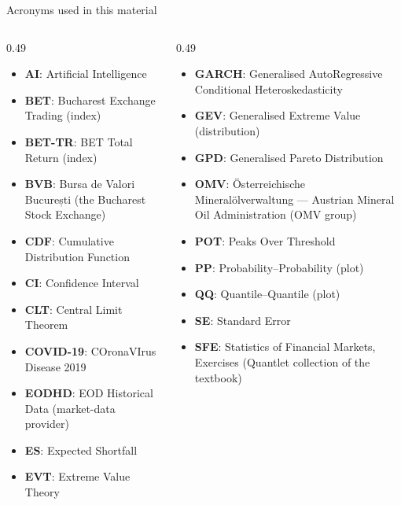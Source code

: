 {
\begin{frame}[noframenumbering]
    \titlepage
\end{frame}
}
\begin{frame}{Acronyms used in this material}
\begin{columns}[T]
\begin{column}{0.49\textwidth}
\begin{itemize}\setlength{\itemsep}{0pt}
    \item \textbf{AI}: Artificial Intelligence
    \item \textbf{BET}: Bucharest Exchange Trading (index)
    \item \textbf{BET-TR}: BET Total Return (index)
    \item \textbf{BVB}: Bursa de Valori București (the Bucharest Stock Exchange)
    \item \textbf{CDF}: Cumulative Distribution Function
    \item \textbf{CI}: Confidence Interval
    \item \textbf{CLT}: Central Limit Theorem
    \item \textbf{COVID-19}: COronaVIrus Disease 2019
    \item \textbf{EODHD}: EOD Historical Data (market-data provider)
    \item \textbf{ES}: Expected Shortfall
    \item \textbf{EVT}: Extreme Value Theory
\end{itemize}
\end{column}
\begin{column}{0.49\textwidth}
\begin{itemize}\setlength{\itemsep}{0pt}
    \item \textbf{GARCH}: Generalised AutoRegressive Conditional Heteroskedasticity
    \item \textbf{GEV}: Generalised Extreme Value (distribution)
    \item \textbf{GPD}: Generalised Pareto Distribution
    \item \textbf{OMV}: Österreichische Mineralölverwaltung — Austrian Mineral Oil Administration (OMV group)
    \item \textbf{POT}: Peaks Over Threshold
    \item \textbf{PP}: Probability–Probability (plot)
    \item \textbf{QQ}: Quantile–Quantile (plot)
    \item \textbf{SE}: Standard Error
    \item \textbf{SFE}: Statistics of Financial Markets, Exercises (Quantlet collection of the textbook)
\end{itemize}
\end{column}
\end{columns}
\end{frame}

